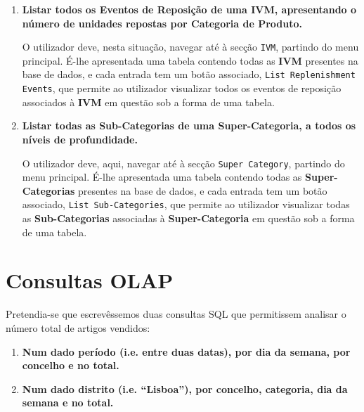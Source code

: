 \documentclass[12pt,a4paper]{article}
\begin{document}
\begin{enumerate}
    \item \textbf{Listar todos os Eventos de Reposição de uma IVM, apresentando
    o número de unidades repostas por Categoria de Produto.}

    O utilizador deve, nesta situação, navegar até à secção \texttt{IVM},
    partindo do menu principal. É-lhe apresentada uma tabela contendo todas as
    \textbf{IVM} presentes na base de dados, e cada entrada tem um botão
    associado, \texttt{List Replenishment Events}, que permite ao utilizador
    visualizar todos os eventos de reposição associados à \textbf{IVM} em questão
    sob a forma de uma tabela.
    
    \item \textbf{Listar todas as Sub-Categorias de uma Super-Categoria, a todos
    os níveis de profundidade.}

    O utilizador deve, aqui, navegar até à secção \texttt{Super Category},
    partindo do menu principal. É-lhe apresentada uma tabela contendo todas as
    \textbf{Super-Categorias} presentes na base de dados, e cada entrada tem um
    botão associado, \texttt{List Sub-Categories}, que permite ao utilizador
    visualizar todas as \textbf{Sub-Categorias} associadas à \textbf{Super-Categoria}
    em questão sob a forma de uma tabela.

  \end{enumerate}


  \section*{Consultas OLAP}

  Pretendia-se que escrevêssemos duas consultas SQL que permitissem analisar o número
  total de artigos vendidos:

  \begin{enumerate}
    \item \textbf{Num dado período (i.e. entre duas datas), por dia da semana, por concelho e no total.}
    
    

    \item \textbf{Num dado distrito (i.e. “Lisboa”), por concelho, categoria, dia da semana e no total.}
  
    
  \end{enumerate}
\end{document}
